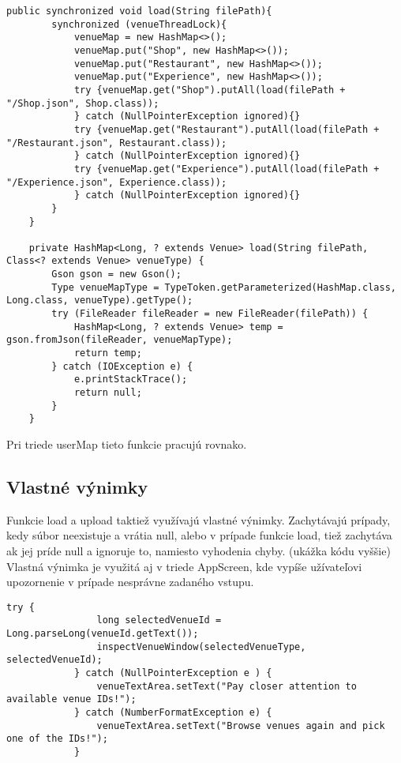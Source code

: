 \documentclass{article}
\begin{document}
\begin{verbatim}
public synchronized void load(String filePath){
        synchronized (venueThreadLock){
            venueMap = new HashMap<>();
            venueMap.put("Shop", new HashMap<>());
            venueMap.put("Restaurant", new HashMap<>());
            venueMap.put("Experience", new HashMap<>());
            try {venueMap.get("Shop").putAll(load(filePath + "/Shop.json", Shop.class));
            } catch (NullPointerException ignored){}
            try {venueMap.get("Restaurant").putAll(load(filePath + "/Restaurant.json", Restaurant.class));
            } catch (NullPointerException ignored){}
            try {venueMap.get("Experience").putAll(load(filePath + "/Experience.json", Experience.class));
            } catch (NullPointerException ignored){}
        }
    }

    private HashMap<Long, ? extends Venue> load(String filePath, Class<? extends Venue> venueType) {
        Gson gson = new Gson();
        Type venueMapType = TypeToken.getParameterized(HashMap.class, Long.class, venueType).getType();
        try (FileReader fileReader = new FileReader(filePath)) {
            HashMap<Long, ? extends Venue> temp = gson.fromJson(fileReader, venueMapType);
            return temp;
        } catch (IOException e) {
            e.printStackTrace();
            return null;
        }
    }
\end{verbatim}
Pri triede userMap tieto funkcie pracujú rovnako. 
\subsection{Vlastné výnimky}
Funkcie load a upload taktiež využívajú vlastné výnimky. Zachytávajú prípady, kedy súbor neexistuje a vrátia null, alebo v prípade funkcie load, tiež zachytáva ak jej príde null a ignoruje to, namiesto vyhodenia chyby. (ukážka kódu vyššie)
Vlastná výnimka je využitá aj v triede AppScreen, kde vypíše užívateľovi upozornenie v prípade nesprávne zadaného vstupu.
\begin{verbatim}
try {
                long selectedVenueId = Long.parseLong(venueId.getText());
                inspectVenueWindow(selectedVenueType, selectedVenueId);
            } catch (NullPointerException e ) {
                venueTextArea.setText("Pay closer attention to available venue IDs!");
            } catch (NumberFormatException e) {
                venueTextArea.setText("Browse venues again and pick one of the IDs!");
            }
\end{verbatim}
\end{document}
